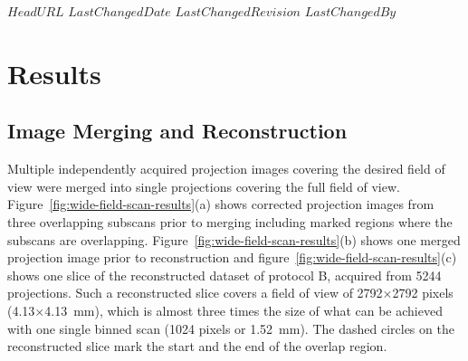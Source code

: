 \svnidlong
{$HeadURL$}
{$LastChangedDate$}
{$LastChangedRevision$}
{$LastChangedBy$}

\section{Results}\label{sec:Results}
\subsection{Image Merging and Reconstruction}\label{sec:Image Merging and Reconstruction}
Multiple independently acquired projection images covering the desired field of view were merged into single projections covering the full field of view. Figure~\ref{fig:wide-field-scan-results}(a) shows corrected projection images from three overlapping subscans prior to merging including marked regions where the subscans are overlapping. Figure~\ref{fig:wide-field-scan-results}(b) shows one merged projection image prior to reconstruction and figure~\ref{fig:wide-field-scan-results}(c) shows one slice of the reconstructed dataset of protocol B, acquired from 5244 projections. Such a reconstructed slice covers a field of view of 2792$\times$2792 pixels (4.13$\times$\SI{4.13}{\milli\meter}), which is almost three times the size of what can be achieved with one single binned scan (1024 pixels or \SI{1.52}{\milli\meter}). %
The dashed circles on the reconstructed slice mark the start and the end of the overlap region.

